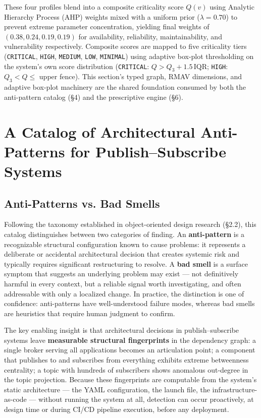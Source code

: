\documentclass[11pt]{article}
\begin{document}
These four profiles blend into a composite criticality score $Q(v)$ using Analytic Hierarchy Process
(AHP) weights \cite{Saaty1980} mixed with a uniform prior ($\lambda=0.70$) to prevent extreme parameter
concentration, yielding final weights of $(0.38, 0.24, 0.19, 0.19)$ for availability, reliability,
maintainability, and vulnerability respectively. Composite scores are mapped to five criticality tiers
(\texttt{CRITICAL}, \texttt{HIGH}, \texttt{MEDIUM}, \texttt{LOW}, \texttt{MINIMAL}) using adaptive
box-plot thresholding on the system's own score distribution (\texttt{CRITICAL}: $Q > Q_3 +
1.5\,\mathrm{IQR}$; \texttt{HIGH}: $Q_3 < Q \le$ upper fence). This section's typed graph, RMAV
dimensions, and adaptive box-plot machinery are the shared foundation consumed by both the anti-pattern
catalog (\S4) and the prescriptive engine (\S6).

\section{A Catalog of Architectural Anti-Patterns for Publish--Subscribe Systems}

\subsection{Anti-Patterns vs. Bad Smells}

Following the taxonomy established in object-oriented design research (\S2.2), this catalog
distinguishes between two categories of finding. An \textbf{anti-pattern} is a recognizable structural
configuration known to cause problems: it represents a deliberate or accidental architectural decision
that creates systemic risk and typically requires significant restructuring to resolve. A \textbf{bad
smell} is a surface symptom that suggests an underlying problem may exist --- not definitively harmful
in every context, but a reliable signal worth investigating, and often addressable with only a
localized change. In practice, the distinction is one of confidence: anti-patterns have
well-understood failure modes, whereas bad smells are heuristics that require human judgment to
confirm.

The key enabling insight is that architectural decisions in publish--subscribe systems leave
\textbf{measurable structural fingerprints} in the dependency graph: a single broker serving all
applications becomes an articulation point; a component that publishes to and subscribes from
everything exhibits extreme betweenness centrality; a topic with hundreds of subscribers shows
anomalous out-degree in the topic projection. Because these fingerprints are computable from the
system's static architecture --- the YAML configuration, the launch file, the infrastructure-as-code
--- without running the system at all, detection can occur proactively, at design time or during
CI/CD pipeline execution, before any deployment.
\end{document}

